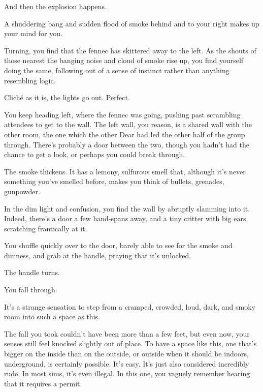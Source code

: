 And then the explosion happens.

\newpage

\label{follow-dear}

\newpage

\label{follow-fennec}

A shuddering bang and sudden flood of smoke behind and to your right makes up your mind for you.

Turning, you find that the fennec has skittered away to the left. As the shouts of those nearest the banging noise and cloud of smoke rise up, you find yourself doing the same, following out of a sense of instinct rather than anything resembling logic.

Cliché as it is, the lights go out. Perfect.

\newpage

You keep heading left, where the fennec was going, pushing past scrambling attendees to get to the wall. The left wall, you reason, is a shared wall with the other room, the one which the other Dear had led the other half of the group through. There's probably a door between the two, though you hadn't had the chance to get a look, or perhaps you could break through.

The smoke thickens. It has a lemony, sulfurous smell that, although it's never something you've smelled before, makes you think of bullets, grenades, gunpowder.

In the dim light and confusion, you find the wall by abruptly slamming into it. Indeed, there's a door a few hand-spans away, and a tiny critter with big ears scratching frantically at it.

You shuffle quickly over to the door, barely able to see for the smoke and dimness, and grab at the handle, praying that it's unlocked.

\newpage

\null
\vfill

The handle turns.

\vfill

\newpage

\null
\vfill

You fall through.

\vfill

\newpage

It's a strange sensation to step from a cramped, crowded, loud, dark, and smoky room into such a space as this.

The fall you took couldn't have been more than a few feet, but even now, your senses still feel knocked slightly out of place. To have a space like this, one that's bigger on the inside than on the outside, or outside when it should be indoors, underground, is certainly possible. It's easy. It's just also considered incredibly rude. In most sims, it's even illegal. In this one, you vaguely remember hearing that it requires a permit.

